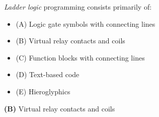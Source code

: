 

{\it Ladder logic} programming consists primarily of:

\begin{itemize}
\item{(A)} Logic gate symbols with connecting lines
\vskip 5pt 
\item{(B)} Virtual relay contacts and coils
\vskip 5pt 
\item{(C)} Function blocks with connecting lines
\vskip 5pt 
\item{(D)} Text-based code
\vskip 5pt 
\item{(E)} Hieroglyphics
\end{itemize}







{\bf (B)} Virtual relay contacts and coils
 










